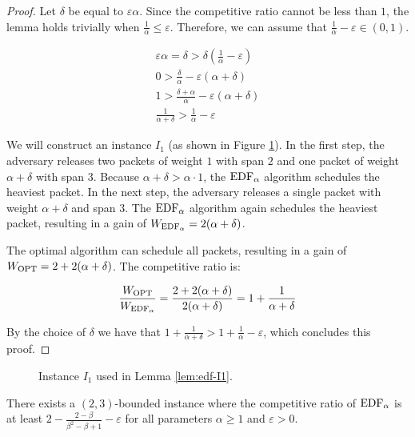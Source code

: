 \begin{proof}
Let $\delta$ be equal to $\varepsilon \alpha$. Since the competitive ratio cannot
be less than $1$, the lemma holds trivially when $\frac{1}{\alpha} \leq
\varepsilon$. Therefore, we can assume that $\frac{1}{\alpha} - \varepsilon \in (0,1)$.

\begin{gather*}
\varepsilon \alpha = \delta > \delta (\frac{1}{\alpha} - \varepsilon) \\
0 > \frac{\delta}{\alpha} - \varepsilon(\alpha + \delta) \\
1 > \frac{\delta + \alpha}{\alpha} - \varepsilon(\alpha + \delta) \\
\frac{1}{\alpha + \delta} > \frac{1}{\alpha} - \varepsilon
\end{gather*}

We will construct an instance $I_1$ (as shown in Figure \ref{img:edf-I1}). In
the first step, the adversary releases two packets of weight $1$ with span $2$
and one packet of weight $\alpha + \delta$ with span $3$. Because $\alpha +
\delta > \alpha \cdot 1$, the $\text{EDF}_\alpha$ algorithm schedules the heaviest packet. In
the next step, the adversary releases a single packet with weight $\alpha +
\delta$ and span $3$. The $\text{EDF}_\alpha$ algorithm again schedules the heaviest packet,
resulting in a gain of $W_{\text{EDF}_\alpha} = 2(\alpha + \delta)$.

The optimal algorithm can schedule all packets, resulting in a gain of $W_{\text{OPT}}
= 2 + 2(\alpha + \delta)$. The competitive ratio is:

\[
\frac{W_{\text{OPT}}}{W_{\text{EDF}_\alpha}} = \frac{2 + 2(\alpha + \delta)}{2(\alpha + \delta)} = 1 + \frac{1}{\alpha + \delta}
\]

By the choice of $\delta$ we have that $1 + \frac{1}{\alpha + \delta} > 1 +
\frac{1}{\alpha} - \varepsilon$, which concludes this proof.
\end{proof}

\begin{figure}[ht]\centering
{}
\caption{Instance $I_1$ used in Lemma \ref{lem:edf-I1}.}
\label{img:edf-I1}
\end{figure}

\begin{lemma}\label{lem:edf-I2}
There exists a $(2,3)$-bounded instance where the competitive ratio of $\text{EDF}_\alpha$
is at least $2 - \frac{2 - \beta}{\beta^2 - \beta + 1} - \varepsilon$ for all
parameters $\alpha \geq 1$ and $\varepsilon > 0$.
\end{lemma}


